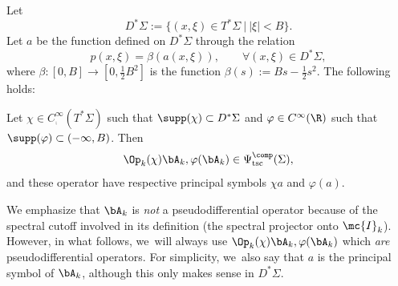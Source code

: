 Let
\[
D^*\Sigma := \{(x,\xi) \in T^*\Sigma ~|~ |\xi| < B\}.
\]
Let $a$ be the function defined on $D^*\Sigma$ through the relation
\begin{equation}
\label{equation:mercredi-aprem}
p(x,\xi) = \beta (a (x, \xi)), \qquad \forall (x,\xi) \in D^*\Sigma,
\end{equation}
where $\beta : [0,B] \rightarrow [0, \frac{1}{2} B^2 ]$ is the function $ \beta (s) := B s -\frac{1}{2} s^2$. The following holds:

\begin{lemma}
Let $\chi \in C^\infty_{{\comp}}(T^*\Sigma)$ such that $\supp(\chi) \subset D^*\Sigma$ and $\varphi \in C^\infty(\R)$ such that $\supp(\varphi) \subset (-\infty,B)$. Then
\[
\Op_k(\chi) \bA_k, \varphi(\bA_k) \in \Psi^{\comp}_{\mathrm{tsc}}(\Sigma),
\]
and these operator have respective principal symbols $\chi a$ and $\varphi(a)$.
\end{lemma}

We emphasize that $\bA_k$ is \emph{not} a pseudodifferential operator because of the spectral cutoff involved in its definition (the spectral projector onto $\mc{I}_k$). However, in what follows, we~will always use $\Op_k(\chi) \bA_k, \varphi(\bA_k)$ which \emph{are} pseudodifferential operators. For simplicity, we~also say that $a$ is the principal symbol of $\bA_k$, although this only makes sense in $D^*\Sigma$.

